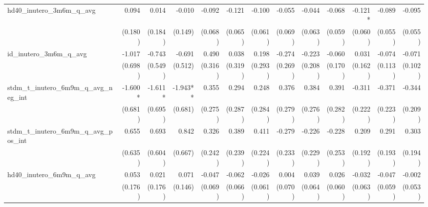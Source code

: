 \begin{tabular}{lrrrrrrrrrrrr}
hd40\_inutero\_3m6m\_q\_avg                 &        0.094 &        0.014 &       -0.010 &       -0.092 &       -0.121 &       -0.100 &       -0.055 &       -0.044 &       -0.068 &      -0.121* &       -0.089 &       -0.095 \\ 
                                            &      (0.180) &      (0.184) &      (0.149) &      (0.068) &      (0.065) &      (0.061) &      (0.069) &      (0.063) &      (0.059) &      (0.060) &      (0.055) &      (0.055) \\ 
id\_inutero\_3m6m\_q\_avg                   &       -1.017 &       -0.743 &       -0.691 &        0.490 &        0.038 &        0.198 &       -0.274 &       -0.223 &       -0.060 &        0.031 &       -0.074 &       -0.071 \\ 
                                            &      (0.698) &      (0.549) &      (0.512) &      (0.316) &      (0.319) &      (0.293) &      (0.269) &      (0.208) &      (0.170) &      (0.162) &      (0.113) &      (0.102) \\ 
stdm\_t\_inutero\_6m9m\_q\_avg\_neg\_int    &      -1.600* &      -1.611* &     -1.943** &        0.355 &        0.294 &        0.248 &        0.376 &        0.384 &        0.391 &       -0.311 &       -0.371 &       -0.344 \\ 
                                            &      (0.681) &      (0.695) &      (0.681) &      (0.275) &      (0.287) &      (0.284) &      (0.279) &      (0.276) &      (0.282) &      (0.222) &      (0.223) &      (0.209) \\ 
stdm\_t\_inutero\_6m9m\_q\_avg\_pos\_int    &        0.655 &        0.693 &        0.842 &        0.326 &        0.389 &        0.411 &       -0.279 &       -0.226 &       -0.228 &        0.209 &        0.291 &        0.303 \\ 
                                            &      (0.635) &      (0.604) &      (0.667) &      (0.242) &      (0.239) &      (0.224) &      (0.233) &      (0.229) &      (0.253) &      (0.192) &      (0.193) &      (0.194) \\ 
hd40\_inutero\_6m9m\_q\_avg                 &        0.053 &        0.021 &        0.071 &       -0.047 &       -0.062 &       -0.026 &        0.004 &        0.039 &        0.026 &       -0.032 &       -0.047 &       -0.002 \\ 
                                            &      (0.176) &      (0.176) &      (0.146) &      (0.069) &      (0.066) &      (0.061) &      (0.070) &      (0.064) &      (0.060) &      (0.063) &      (0.059) &      (0.053) \\ 

\end{tabular}
